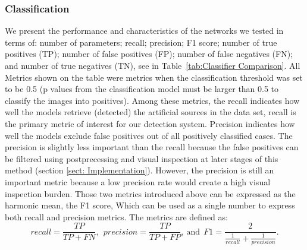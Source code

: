 \documentclass{aastex631}
\begin{document}
\subsubsection{Classification} 
\label{subsubsect: Classification}

We present the performance and characteristics of the networks we tested in terms of: number of parameters; recall; precision; F1 score; number of true positives (TP); number of false positives (FP); number of false negatives (FN); and number of true negatives (TN), see in Table~\ref{tab:Classifier Comparison}.
All Metrics shown on the table were metrics when the classification threshold was set to be 0.5 (p values from the classification model must be larger than 0.5 to classify the images into positives).
Among these metrics, the recall indicates how well the models retrieve (detected) the artificial sources in the data set, recall is the primary metric of interest for our detection system.
Precision indicates how well the models exclude false positives out of all positively classified cases.
The precision is slightly less important than the recall because the false positives can be filtered using postprecessing and visual inspection at later stages of this method (section \ref{sect: Implementation}).
However, the precision is still an  important metric because a low precision rate would create a high visual inspection burden. 
Those two metrics introduced above can be expressed as the harmonic mean, the F1 score,
Which can be used as a single number to express both recall and precision metrics. The metrics are defined as:\\
\begin{equation}
    \label{eq:rpf}
    recall = \frac{TP}{TP+FN},\:\:precision=\frac{TP}{TP+FP},\:\textrm{and}\:\:F1 = \frac{2}{\frac{1}{recall}+\frac{1}{precision}}.
\end{equation}
\end{document}
